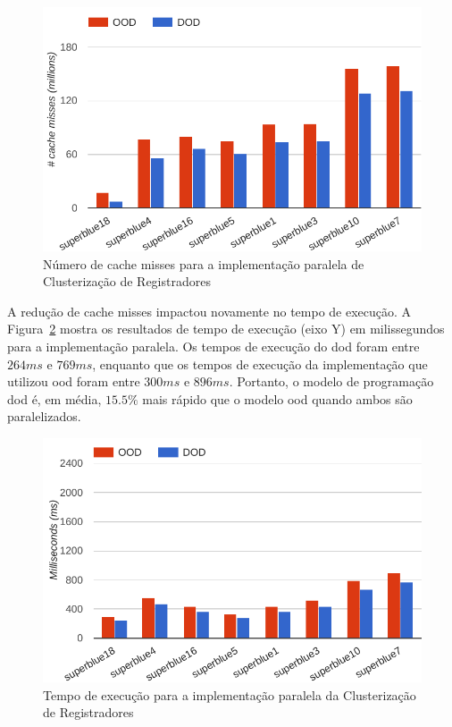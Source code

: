 \begin{figure}[ht]
    \centering
    \includegraphics[width=0.7\linewidth]{img/results/missProblemC_parallel_rtree}
    \caption[Cache misses Problema~C versão paralela]{Número de cache misses para a implementação paralela de Clusterização de Registradores}
    \label{fig:missProblemC_parallel_rtree}
\end{figure}

A redução de cache misses impactou novamente no tempo de execução. A Figura~\ref{fig:runtimeProblemC_parallel_rtree} mostra os resultados de tempo de execução (eixo Y) em milissegundos para a implementação paralela. Os tempos de execução do \ac{dod} foram entre $264ms$ e $769ms$, enquanto que os tempos de execução da implementação que utilizou \ac{ood} foram entre $ 300ms $ e $ 896ms $. Portanto, o modelo de programação \ac{dod} é, em média, $ 15.5\% $ mais rápido que o modelo \ac{ood} quando ambos são paralelizados.


\begin{figure}[ht]
    \centering
    \includegraphics[width=0.7\linewidth]{img/results/runtimeProblemC_parallel_rtree}
    \caption[Tempo de execução Problema~C versão paralela]{Tempo de execução para a implementação paralela da Clusterização de Registradores}
    \label{fig:runtimeProblemC_parallel_rtree}
\end{figure}

